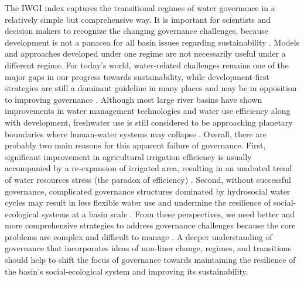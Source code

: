 \documentclass[9pt, twocolumn, twoside, lineno]{pnas-new}
\begin{document}
The IWGI index captures the transitional regimes of water governance in a relatively simple but comprehensive way.
It is important for scientists and decision makers to recognize the changing governance challenges, because development is not a panacea for all basin issues regarding sustainability 
\cite{cummingLinkingEconomicGrowth2018,reyers2018}.
Models and approaches developed under one regime are not necessarily useful under a different regime.
For today's world, water-related challenges remains one of the major gaps in our progress towards sustainability, while development-first strategies are still a dominant guideline in many places and may be in opposition to improving governance 
\cite{xu2020,liu2017,greveGlobalAssessmentWater2018}. 
Although most large river basins have shown improvements in water management technologies and water use efficiency along with development, freshwater use is still considered to be approaching planetary boundaries where human-water systems may collapse 
\cite{li2020a,degraaf2019,huggins2020}.
Overall, there are probably two main reasons for this apparent failure of governance.
First, significant improvement in agricultural irrigation efficiency is usually accompanied by a re-expansion of irrigated area, resulting in an unabated trend of water resources stress (the paradox of efficiency) 
\cite{grafton2018}. 
Second, without successful governance, complicated governance structures dominated by hydrosocial water cycles may result in less flexible water use and undermine the resilience of social-ecological systems at a basin scale
\cite{qin2019,levia2020,grill2019}.
From these perspectives, we need better and more comprehensive strategies to address governance challenges because the core problems are complex and difficult to manage 
\cite{steffen2020,muneepeerakul2020,bodinCollaborativeEnvironmentalGovernance2017,biermann2012}. 
A deeper understanding of governance that incorporates ideas of non-liner change, regimes, and transitions should help to shift the focus of governance towards maintaining the resilience of the basin’s social-ecological system and improving its sustainability.
\end{document}
